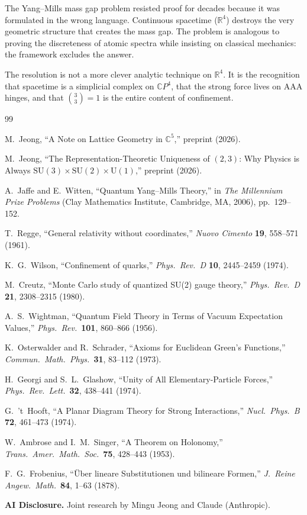 \documentclass[12pt]{article}
\theoremstyle{remark}
\begin{document}
The Yang--Mills mass gap problem resisted proof for decades because it
was formulated in the wrong language. Continuous spacetime
($\mathbb{R}^4$) destroys the very geometric structure that creates the
mass gap. The problem is analogous to proving the discreteness of atomic
spectra while insisting on classical mechanics: the framework excludes
the answer.

The resolution is not a more clever analytic technique on $\mathbb{R}^4$.
It is the recognition that spacetime is a simplicial complex on
$\mathbb{C}P^4$, that the strong force lives on AAA hinges, and that
$\binom{3}{3} = 1$ is the entire content of confinement.

\begin{thebibliography}{99}

 M.~Jeong, ``A Note on Lattice Geometry in
  $\mathbb{C}^5$,'' preprint (2026).

 M.~Jeong, ``The Representation-Theoretic Uniqueness
  of $(2,3)$: Why Physics is Always
  $\mathrm{SU}(3)\times\mathrm{SU}(2)\times\mathrm{U}(1)$,''
  preprint (2026).

 A.~Jaffe and E.~Witten, ``Quantum Yang--Mills Theory,''
  in \emph{The Millennium Prize Problems} (Clay Mathematics Institute,
  Cambridge, MA, 2006), pp.~129--152.

 T.~Regge, ``General relativity without coordinates,''
  \emph{Nuovo Cimento} \textbf{19}, 558--571 (1961).

 K.~G.~Wilson, ``Confinement of quarks,''
  \emph{Phys.\ Rev.\ D} \textbf{10}, 2445--2459 (1974).

 M.~Creutz, ``Monte Carlo study of quantized SU(2)
  gauge theory,'' \emph{Phys.\ Rev.\ D} \textbf{21}, 2308--2315 (1980).

 A.~S.~Wightman, ``Quantum Field Theory in Terms of
  Vacuum Expectation Values,'' \emph{Phys.\ Rev.}\ \textbf{101},
  860--866 (1956).

 K.~Osterwalder and R.~Schrader, ``Axioms for Euclidean
  Green's Functions,'' \emph{Commun.\ Math.\ Phys.}\ \textbf{31},
  83--112 (1973).

 H.~Georgi and S.~L.~Glashow,
  ``Unity of All Elementary-Particle Forces,''
  \emph{Phys.\ Rev.\ Lett.}\ \textbf{32}, 438--441 (1974).

 G.~'t~Hooft, ``A Planar Diagram Theory for Strong
  Interactions,'' \emph{Nucl.\ Phys.\ B} \textbf{72}, 461--473 (1974).

 W.~Ambrose and I.~M.~Singer,
  ``A Theorem on Holonomy,'' \emph{Trans.\ Amer.\ Math.\ Soc.}\
  \textbf{75}, 428--443 (1953).

 F.~G.~Frobenius,
  ``\"Uber lineare Substitutionen und bilineare Formen,''
  \emph{J.\ Reine Angew.\ Math.}\ \textbf{84}, 1--63 (1878).

\end{thebibliography}

\bigskip
\noindent\textbf{AI Disclosure.} Joint research by Mingu Jeong and
Claude (Anthropic).
\end{document}
